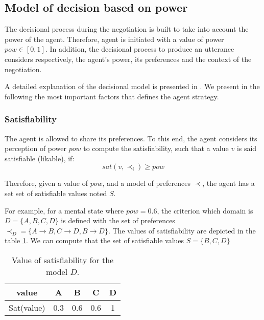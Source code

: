 \documentclass{llncs}
\begin{document}
		 \subsection{Model of decision based on power}
		The decisional process during the negotiation is built to take into account the power of the agent. Therefore, agent is initiated with a value of power $pow \in [0,1]$. In addition, the decisional process to produce an utterance considers respectively, the agent's power, its preferences and the context of the negotiation.  
		
		A detailed explanation of the decisional model is presented in \cite{} . We present in the following the most important factors that defines the agent strategy.
		
		\subsubsection{Satisfiability }
		\label{sec:sat}
		The agent is allowed to share its preferences. %
		To this end, the agent considers its perception of power $pow$ to compute the satisfiability, such that a value $v$ is said satisfiable (likable), if:  
		\begin{equation}
		 	sat(v, \prec_i) \geq pow
		\end{equation}
	
		Therefore, given a value of $pow$, and a model of preferences $\prec$, the agent has a set set of satisfiable values noted $S$. 
		
		\par For example, for  a mental state where $pow =0.6$, the criterion which domain is  $D =\{A, B, C, D\}$ is defined with the set of preferences $ \prec_D = \{A \rightarrow  B, C \rightarrow  D , B \rightarrow D \}$. The values of satisfiability are depicted in the table \ref{sat}. We can compute that the set of satisfiable values $ S = \{B, C, D\}$ 
			 \begin{table}
			 	\centering
			 	\begin{tabular}{ |c|c|c|c|c| }
			 		\hline				
			 		value & A & B & C & D \\
			 		\hline

			 		\hline
			 		Sat(value) & 0.3 & 0.6 & 0.6 & 1 \\
			 		\hline
			 		
			 	\end{tabular}
			 	\caption{Value of satisfiability for the model $D$.}
			 	\label{sat}
			 \end{table}
		
\end{document}
